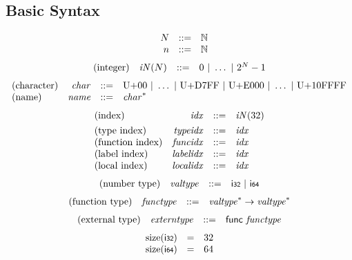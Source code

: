\documentclass{article}
\begin{document}
\subsection{Basic Syntax}
$$
\begin{array}{@{}lrrl@{}l@{}}
& N &::=& \mathbb{N} \\
& n &::=& \mathbb{N} \\
\end{array}
$$
$$
\begin{array}{@{}lrrl@{}l@{}}
\mbox{(integer)} & {\mathit{iN}}(N) &::=& 0 ~|~ \dots ~|~ {2^{N}} - 1 \\
\end{array}
$$
$$
\begin{array}{@{}lrrl@{}l@{}}
\mbox{(character)} & {\mathit{char}} &::=& \mathrm{U{+}00} ~|~ \dots ~|~ \mathrm{U{+}D7FF} ~|~ \mathrm{U{+}E000} ~|~ \dots ~|~ \mathrm{U{+}10FFFF} \\
\mbox{(name)} & {\mathit{name}} &::=& {{\mathit{char}}^\ast} \\
\end{array}
$$
$$
\begin{array}{@{}lrrl@{}l@{}}
\mbox{(index)} & {\mathit{idx}} &::=& {\mathit{iN}}(32) \\[0.8ex]
\mbox{(type index)} & {\mathit{typeidx}} &::=& {\mathit{idx}} \\
\mbox{(function index)} & {\mathit{funcidx}} &::=& {\mathit{idx}} \\
\mbox{(label index)} & {\mathit{labelidx}} &::=& {\mathit{idx}} \\
\mbox{(local index)} & {\mathit{localidx}} &::=& {\mathit{idx}} \\
\end{array}
$$
$$
\begin{array}{@{}lrrl@{}l@{}}
\mbox{(number type)} & {\mathit{valtype}} &::=& \mathsf{i{\scriptstyle 32}} ~|~ \mathsf{i{\scriptstyle 64}} \\
\end{array}
$$
$$
\begin{array}{@{}lrrl@{}l@{}}
\mbox{(function type)} & {\mathit{functype}} &::=& {{\mathit{valtype}}^\ast} \rightarrow {{\mathit{valtype}}^\ast} \\
\end{array}
$$
$$
\begin{array}{@{}lrrl@{}l@{}}
\mbox{(external type)} & {\mathit{externtype}} &::=& \mathsf{func}~{\mathit{functype}} \\
\end{array}
$$
$$
\begin{array}{@{}lcl@{}l@{}}
{\mathrm{size}}(\mathsf{i{\scriptstyle 32}}) &=& 32 \\
{\mathrm{size}}(\mathsf{i{\scriptstyle 64}}) &=& 64 \\
\end{array}
$$
\end{document}
